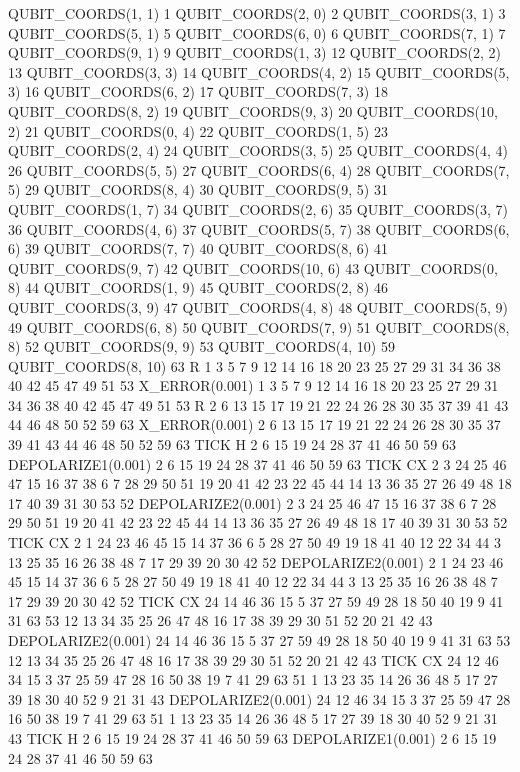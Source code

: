 QUBIT_COORDS(1, 1) 1
QUBIT_COORDS(2, 0) 2
QUBIT_COORDS(3, 1) 3
QUBIT_COORDS(5, 1) 5
QUBIT_COORDS(6, 0) 6
QUBIT_COORDS(7, 1) 7
QUBIT_COORDS(9, 1) 9
QUBIT_COORDS(1, 3) 12
QUBIT_COORDS(2, 2) 13
QUBIT_COORDS(3, 3) 14
QUBIT_COORDS(4, 2) 15
QUBIT_COORDS(5, 3) 16
QUBIT_COORDS(6, 2) 17
QUBIT_COORDS(7, 3) 18
QUBIT_COORDS(8, 2) 19
QUBIT_COORDS(9, 3) 20
QUBIT_COORDS(10, 2) 21
QUBIT_COORDS(0, 4) 22
QUBIT_COORDS(1, 5) 23
QUBIT_COORDS(2, 4) 24
QUBIT_COORDS(3, 5) 25
QUBIT_COORDS(4, 4) 26
QUBIT_COORDS(5, 5) 27
QUBIT_COORDS(6, 4) 28
QUBIT_COORDS(7, 5) 29
QUBIT_COORDS(8, 4) 30
QUBIT_COORDS(9, 5) 31
QUBIT_COORDS(1, 7) 34
QUBIT_COORDS(2, 6) 35
QUBIT_COORDS(3, 7) 36
QUBIT_COORDS(4, 6) 37
QUBIT_COORDS(5, 7) 38
QUBIT_COORDS(6, 6) 39
QUBIT_COORDS(7, 7) 40
QUBIT_COORDS(8, 6) 41
QUBIT_COORDS(9, 7) 42
QUBIT_COORDS(10, 6) 43
QUBIT_COORDS(0, 8) 44
QUBIT_COORDS(1, 9) 45
QUBIT_COORDS(2, 8) 46
QUBIT_COORDS(3, 9) 47
QUBIT_COORDS(4, 8) 48
QUBIT_COORDS(5, 9) 49
QUBIT_COORDS(6, 8) 50
QUBIT_COORDS(7, 9) 51
QUBIT_COORDS(8, 8) 52
QUBIT_COORDS(9, 9) 53
QUBIT_COORDS(4, 10) 59
QUBIT_COORDS(8, 10) 63
R 1 3 5 7 9 12 14 16 18 20 23 25 27 29 31 34 36 38 40 42 45 47 49 51 53
X_ERROR(0.001) 1 3 5 7 9 12 14 16 18 20 23 25 27 29 31 34 36 38 40 42 45 47 49 51 53
R 2 6 13 15 17 19 21 22 24 26 28 30 35 37 39 41 43 44 46 48 50 52 59 63
X_ERROR(0.001) 2 6 13 15 17 19 21 22 24 26 28 30 35 37 39 41 43 44 46 48 50 52 59 63
TICK
H 2 6 15 19 24 28 37 41 46 50 59 63
DEPOLARIZE1(0.001) 2 6 15 19 24 28 37 41 46 50 59 63
TICK
CX 2 3 24 25 46 47 15 16 37 38 6 7 28 29 50 51 19 20 41 42 23 22 45 44 14 13 36 35 27 26 49 48 18 17 40 39 31 30 53 52
DEPOLARIZE2(0.001) 2 3 24 25 46 47 15 16 37 38 6 7 28 29 50 51 19 20 41 42 23 22 45 44 14 13 36 35 27 26 49 48 18 17 40 39 31 30 53 52
TICK
CX 2 1 24 23 46 45 15 14 37 36 6 5 28 27 50 49 19 18 41 40 12 22 34 44 3 13 25 35 16 26 38 48 7 17 29 39 20 30 42 52
DEPOLARIZE2(0.001) 2 1 24 23 46 45 15 14 37 36 6 5 28 27 50 49 19 18 41 40 12 22 34 44 3 13 25 35 16 26 38 48 7 17 29 39 20 30 42 52
TICK
CX 24 14 46 36 15 5 37 27 59 49 28 18 50 40 19 9 41 31 63 53 12 13 34 35 25 26 47 48 16 17 38 39 29 30 51 52 20 21 42 43
DEPOLARIZE2(0.001) 24 14 46 36 15 5 37 27 59 49 28 18 50 40 19 9 41 31 63 53 12 13 34 35 25 26 47 48 16 17 38 39 29 30 51 52 20 21 42 43
TICK
CX 24 12 46 34 15 3 37 25 59 47 28 16 50 38 19 7 41 29 63 51 1 13 23 35 14 26 36 48 5 17 27 39 18 30 40 52 9 21 31 43
DEPOLARIZE2(0.001) 24 12 46 34 15 3 37 25 59 47 28 16 50 38 19 7 41 29 63 51 1 13 23 35 14 26 36 48 5 17 27 39 18 30 40 52 9 21 31 43
TICK
H 2 6 15 19 24 28 37 41 46 50 59 63
DEPOLARIZE1(0.001) 2 6 15 19 24 28 37 41 46 50 59 63
